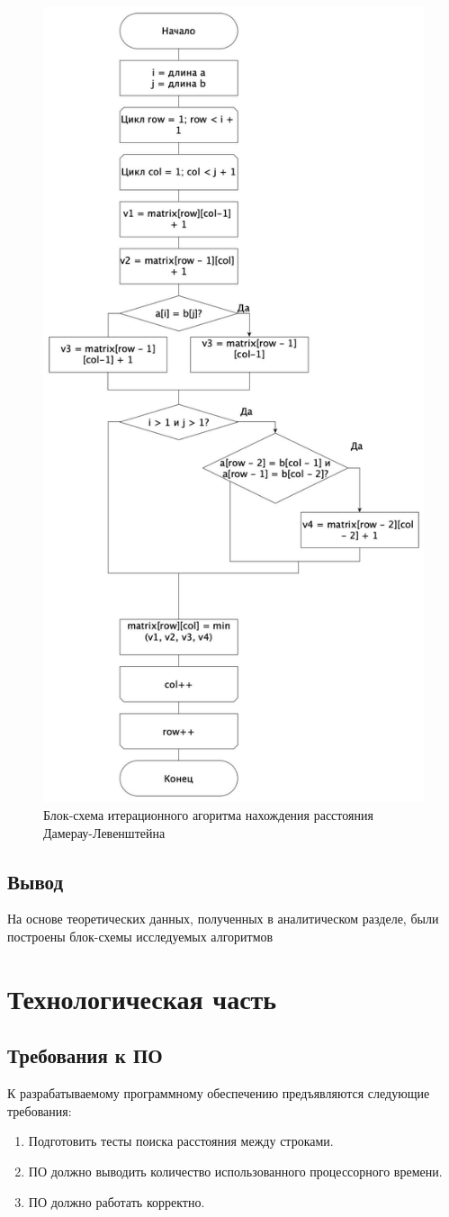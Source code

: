 \documentclass[12pt]{report}
\begin{document}
    \begin{figure}[H]
        \centering
        \includegraphics[width=0.6\linewidth]{img/levDamCasual}
        \caption{Блок-схема итерационного агоритма нахождения расстояния Дамерау-Левенштейна}
        \label{fig:levDamCasual}
    \end{figure}


    \section{Вывод}
    На основе теоретических данных, полученных в аналитическом разделе,
    были построены блок-схемы исследуемых алгоритмов


    \chapter{Технологическая часть}


    \section{Требования к ПО}
    К разрабатываемому программному обеспечению предъявляются следующие требования:
    \begin{enumerate}
        \item Подготовить тесты поиска расстояния между строками.
        \item ПО должно выводить количество использованного процессорного времени.
        \item ПО должно работать корректно.
    \end{enumerate}
\end{document}
